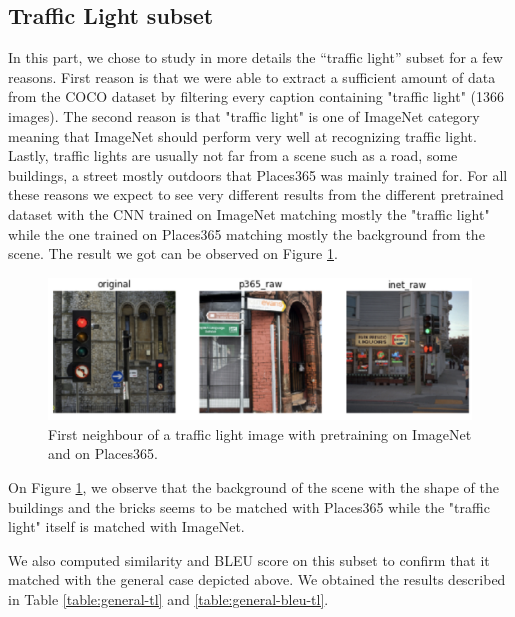 \documentclass[a4paper]{article}
\begin{document}
	\subsection{Traffic Light subset}
	
In this part, we chose to study in more details the “traffic light” subset for a few reasons. First reason is that we were able to extract a sufficient amount of data from the COCO dataset by filtering every caption containing "traffic light" (1366 images). The second reason is that "traffic light" is one of ImageNet category meaning that ImageNet should perform very well at recognizing traffic light. Lastly, traffic lights are usually not far from a scene such as a road, some buildings, a street mostly outdoors that Places365 was mainly trained for. For all these reasons we expect to see very different results from the different pretrained dataset with the CNN trained on ImageNet matching mostly the "traffic light" while the one trained on Places365 matching mostly the background from the scene. The result we got can be observed on Figure \ref{fig:visual-subgroup}.

\begin{figure}[h]
	\includegraphics[width=\textwidth]{visual-subgroup}
	\caption{First neighbour of a traffic light image with pretraining on ImageNet and on Places365.}
	\label{fig:visual-subgroup}
\end{figure}

On Figure \ref{fig:visual-subgroup}, we observe that the background of the scene with the shape of the buildings and the bricks seems to be matched with Places365 while the "traffic light" itself is matched with ImageNet.


We also computed similarity and BLEU score on this subset to confirm that it matched with the general case depicted above. We obtained the results described in Table \ref{table:general-tl} and \ref{table:general-bleu-tl}.
\end{document}
